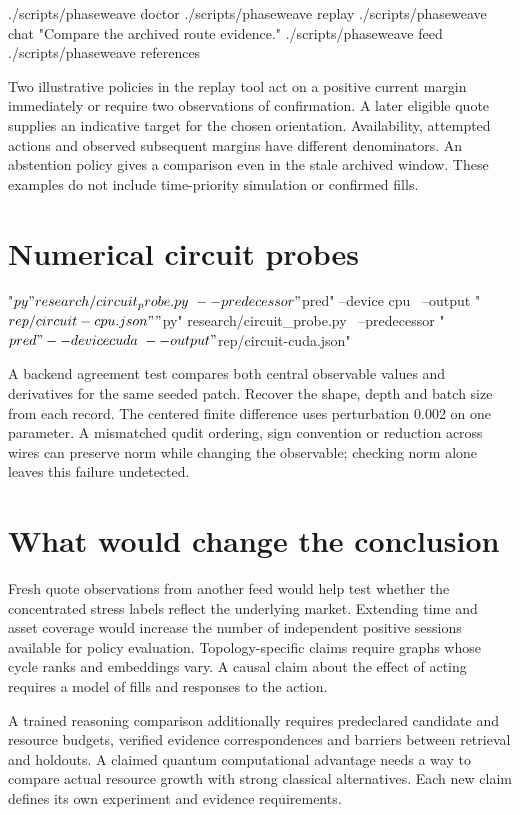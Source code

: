 \documentclass[11pt,oneside,openany]{book}
\begin{document}
\begin{BookCode}
./scripts/phaseweave doctor
./scripts/phaseweave replay
./scripts/phaseweave chat "Compare the archived route evidence."
./scripts/phaseweave feed
./scripts/phaseweave references
\end{BookCode}
Two illustrative policies in the replay tool act on a positive current margin immediately or require two observations of confirmation. A later eligible quote supplies an indicative target for the chosen orientation. Availability, attempted actions and observed subsequent margins have different denominators. An abstention policy gives a comparison even in the stale archived window. These examples do not include time-priority simulation or confirmed fills.

\section*{Numerical circuit probes}
\begin{BookCode}
"$py" research/circuit_probe.py \
  --predecessor "$pred" --device cpu \
  --output "$rep/circuit-cpu.json"
"$py" research/circuit_probe.py \
  --predecessor "$pred" --device cuda \
  --output "$rep/circuit-cuda.json"
\end{BookCode}
A backend agreement test compares both central observable values and derivatives for the same seeded patch. Recover the shape, depth and batch size from each record. The centered finite difference uses perturbation 0.002 on one parameter. A mismatched qudit ordering, sign convention or reduction across wires can preserve norm while changing the observable; checking norm alone leaves this failure undetected.

\section*{What would change the conclusion}
Fresh quote observations from another feed would help test whether the concentrated stress labels reflect the underlying market. Extending time and asset coverage would increase the number of independent positive sessions available for policy evaluation. Topology-specific claims require graphs whose cycle ranks and embeddings vary. A causal claim about the effect of acting requires a model of fills and responses to the action.

A trained reasoning comparison additionally requires predeclared candidate and resource budgets, verified evidence correspondences and barriers between retrieval and holdouts. A claimed quantum computational advantage needs a way to compare actual resource growth with strong classical alternatives. Each new claim defines its own experiment and evidence requirements.
\end{document}
